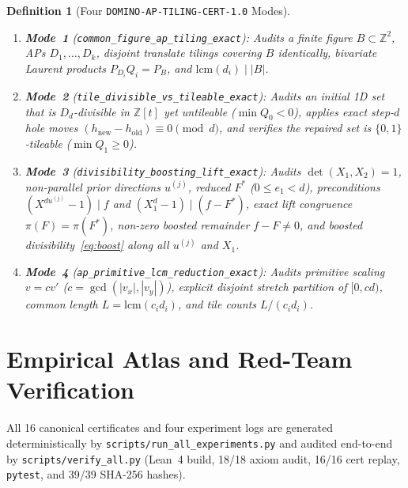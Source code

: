 \documentclass[11pt,twocolumn]{article}
\newtheorem{definition}{Definition}
\newcommand{\ZZ}{\mathbb{Z}}
\begin{document}
\begin{definition}[Four \texttt{DOMINO-AP-TILING-CERT-1.0} Modes]\label{def:modes}
\leavevmode
\begin{enumerate}[leftmargin=*,nosep]
  \item \textbf{Mode~1} (\texttt{\small common\_\allowbreak figure\_\allowbreak ap\_\allowbreak tiling\_\allowbreak exact}): Audits a finite figure $B \subset \ZZ^2$, APs $D_1,\dots,D_k$, disjoint translate tilings covering $B$ identically, bivariate Laurent products $P_{D_i} Q_i = P_B$, and $\mathrm{lcm}(d_i) \mid |B|$.
  \item \textbf{Mode~2} (\texttt{\small tile\_\allowbreak divisible\_\allowbreak vs\_\allowbreak tileable\_\allowbreak exact}): Audits an initial 1D set that is $D_d$-divisible in $\ZZ[t]$ yet untileable ($\min Q_0 < 0$), applies exact step-$d$ hole moves $(h_{\mathrm{new}} - h_{\mathrm{old}}) \equiv 0 \pmod d$, and verifies the repaired set is $\{0,1\}$-tileable ($\min Q_1 \ge 0$).
  \item \textbf{Mode~3} (\texttt{\small divisibility\_\allowbreak boosting\_\allowbreak lift\_\allowbreak exact}): Audits $\det(X_1, X_2)=1$, non-parallel prior directions $u^{(j)}$, reduced $F^*$ ($0 \le e_1 < d$), preconditions $(X^{d u^{(j)}}-1)\mid f$ and $(X_1^d-1)\mid(f-F^*)$, exact lift congruence $\pi(F)=\pi(F^*)$, non-zero boosted remainder $f - F \neq 0$, and boosted divisibility~\eqref{eq:boost} along all $u^{(j)}$ and $X_1$.
  \item \textbf{Mode~4} (\texttt{\small ap\_\allowbreak primitive\_\allowbreak lcm\_\allowbreak reduction\_\allowbreak exact}): Audits primitive scaling $v = c v'$ ($c=\gcd(|v_x|,|v_y|)$), explicit disjoint stretch partition of $[0, cd)$, common length $L = \mathrm{lcm}(c_i d_i)$, and tile counts $L/(c_i d_i)$.
\end{enumerate}
\end{definition}

\section{Empirical Atlas and Red-Team Verification}\label{sec:results}
All 16 canonical certificates and four experiment logs are generated deterministically by \texttt{scripts/run\_all\_experiments.py} and audited end-to-end by \texttt{scripts/verify\_all.py} (Lean~4 build, 18/18 axiom audit, 16/16 cert replay, \texttt{pytest}, and 39/39 SHA-256 hashes).
\end{document}
